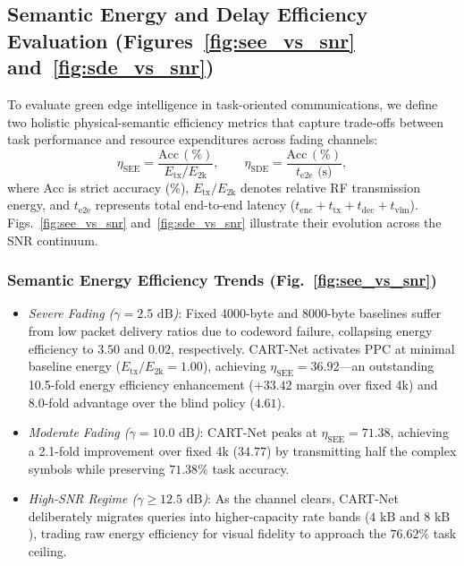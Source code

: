 \subsection{Semantic Energy and Delay Efficiency Evaluation (Figures~\ref{fig:see_vs_snr} and~\ref{fig:sde_vs_snr})}
To evaluate green edge intelligence in task-oriented communications, we define two holistic physical-semantic efficiency metrics that capture trade-offs between task performance and resource expenditures across fading channels:
\begin{equation}
    \eta_{\mathrm{SEE}} = \frac{\mathrm{Acc}\,(\%)}{E_{\mathrm{tx}} / E_{2\mathrm{k}}}, \qquad \eta_{\mathrm{SDE}} = \frac{\mathrm{Acc}\,(\%)}{t_{\mathrm{e2e}}\text{ (s)}},
\end{equation}
where $\mathrm{Acc}$ is strict accuracy (\%), $E_{\mathrm{tx}} / E_{2\mathrm{k}}$ denotes relative RF transmission energy, and $t_{\mathrm{e2e}}$ represents total end-to-end latency ($t_{\mathrm{enc}} + t_{\mathrm{tx}} + t_{\mathrm{dec}} + t_{\mathrm{vlm}}$). Figs.~\ref{fig:see_vs_snr} and~\ref{fig:sde_vs_snr} illustrate their evolution across the SNR continuum.

\subsubsection{Semantic Energy Efficiency Trends (Fig.~\ref{fig:see_vs_snr})}
\begin{itemize}
    \item \textit{Severe Fading ($\gamma = 2.5\text{ dB}$)}: Fixed 4000-byte and 8000-byte baselines suffer from low packet delivery ratios due to codeword failure, collapsing energy efficiency to $3.50$ and $0.02$, respectively. CART-Net activates PPC at minimal baseline energy ($E_{\mathrm{tx}} / E_{2\mathrm{k}} = 1.00$), achieving $\eta_{\mathrm{SEE}} = 36.92$---an outstanding 10.5-fold energy efficiency enhancement ($+33.42$ margin over fixed 4k) and 8.0-fold advantage over the blind policy ($4.61$).
    \item \textit{Moderate Fading ($\gamma = 10.0\text{ dB}$)}: CART-Net peaks at $\eta_{\mathrm{SEE}} = 71.38$, achieving a 2.1-fold improvement over fixed 4k ($34.77$) by transmitting half the complex symbols while preserving $71.38\%$ task accuracy.
    \item \textit{High-SNR Regime ($\gamma \ge 12.5\text{ dB}$)}: As the channel clears, CART-Net deliberately migrates queries into higher-capacity rate bands ($4\text{ kB}$ and $8\text{ kB}$), trading raw energy efficiency for visual fidelity to approach the $76.62\%$ task ceiling.
\end{itemize}

